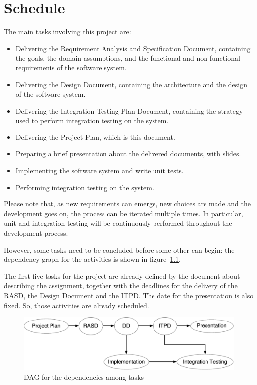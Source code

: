 \chapter{Schedule}
The main tasks involving this project are:
\begin{itemize}
	\item Delivering the Requirement Analysis and Specification Document, containing the goals, the domain assumptions, and the functional and non-functional requirements of the software system.
	\item Delivering the Design Document, containing the architecture and the design of the software system.
	\item Delivering the Integration Testing Plan Document, containing the strategy used to perform integration testing on the system.
	\item Delivering the Project Plan, which is this document.
	\item Preparing a brief presentation about the delivered documents, with slides.
	\item Implementing the software system and write unit tests.
	\item Performing integration testing on the system.
\end{itemize}

Please note that, as new requirements can emerge, new choices are made and the development goes on, the process can be iterated multiple times. In particular, unit and integration testing will be continuously performed throughout the development process.

However, some tasks need to be concluded before some other can begin: the dependency graph for the activities is shown in figure~\ref{fig:dag_tasks}.

The first five tasks for the project are already defined by the document about describing the assignment, together with the deadlines for the delivery of the RASD, the Design Document and the ITPD. The date for the presentation is also fixed. So, those activities are already scheduled.

\begin{figure}[H]
	\centering
	\includegraphics[width=\linewidth,keepaspectratio]{figures/dag_tasks.eps}
	\caption{DAG for the dependencies among tasks}
	\label{fig:dag_tasks}
\end{figure}

